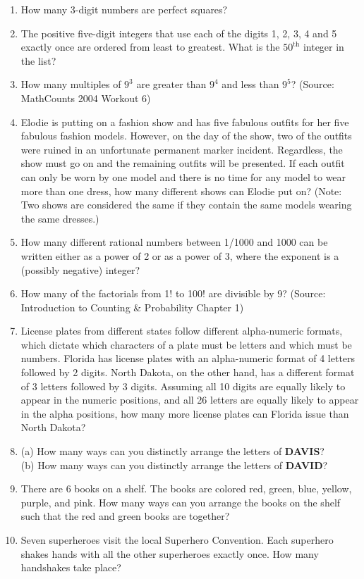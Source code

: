 \documentclass[12pt, letterpaper]{article}
\begin{document}
\begin{enumerate}
    \item How many 3-digit numbers are perfect squares?
    \item The positive five-digit integers that use each of the digits 1, 2, 3, 4 and 5 exactly once are ordered from least to greatest. What is the $50^{\text{th}}$ integer in the list?
    \item How many multiples of $9^3$ are greater than $9^4$ and less than $9^5$? (Source: MathCounts 2004 Workout 6)
    \item Elodie is putting on a fashion show and has five fabulous outfits for her five fabulous fashion models. However, on the day of the show, two of the outfits were ruined in an unfortunate permanent marker incident. Regardless, the show must go on and the remaining outfits will be presented. If each outfit can only be worn by one model and there is no time for any model to wear more than one dress, how many different shows can Elodie put on? (Note: Two shows are considered the same if they contain the same models wearing the same dresses.)
    \item How many different rational numbers between 1/1000 and 1000 can be written either as a power of 2 or as a power of 3, where the exponent is a (possibly negative) integer?
    \item How many of the factorials from 1! to 100! are divisible by 9? (Source: Introduction to Counting \& Probability Chapter 1)
    \item License plates from different states follow different alpha-numeric formats, which dictate which characters of a plate must be letters and which must be numbers. Florida has license plates with an alpha-numeric format of 4 letters followed by 2 digits. North Dakota, on the other hand, has a different format of 3 letters followed by 3 digits. Assuming all 10 digits are equally likely to appear in the numeric positions, and all 26 letters are equally likely to appear in the alpha positions, how many more license plates can Florida issue than North Dakota?
    \item (a) How many ways can you distinctly arrange the letters of \textbf{DAVIS}?\\
    (b) How many ways can you distinctly arrange the letters of \textbf{DAVID}?
    \item There are 6 books on a shelf. The books are colored red, green, blue, yellow, purple, and pink. How many ways can you arrange the books on the shelf such that the red and green books are together?
    \item Seven superheroes visit the local Superhero Convention. Each superhero shakes hands with all the other superheroes exactly once. How many handshakes take place?
\end{enumerate}
\end{document}

